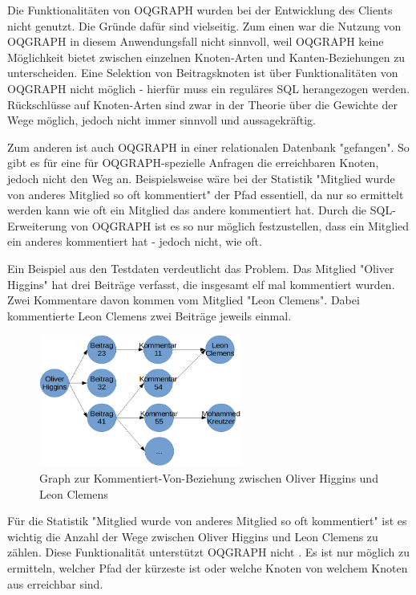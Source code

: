 Die Funktionalitäten von OQGRAPH wurden bei der Entwicklung des Clients nicht genutzt. Die Gründe dafür sind vielseitig. Zum einen war die Nutzung von OQGRAPH in diesem Anwendungsfall nicht sinnvoll, weil OQGRAPH keine Möglichkeit bietet zwischen einzelnen Knoten-Arten und Kanten-Beziehungen zu unterscheiden. Eine Selektion von Beitragsknoten ist über Funktionalitäten von OQGRAPH nicht möglich - hierfür muss ein reguläres SQL herangezogen werden. Rückschlüsse auf Knoten-Arten sind zwar in der Theorie über die Gewichte der Wege möglich, jedoch nicht immer sinnvoll und aussagekräftig.

Zum anderen ist auch OQGRAPH in einer relationalen Datenbank "gefangen". So gibt es für eine für OQGRAPH-spezielle Anfragen die erreichbaren Knoten, jedoch nicht den Weg an. Beispielsweise wäre bei der Statistik "Mitglied wurde von anderes Mitglied so oft kommentiert" der Pfad essentiell, da nur so ermittelt werden kann wie oft ein Mitglied das andere kommentiert hat. Durch die SQL-Erweiterung von OQGRAPH ist es so nur möglich festzustellen, dass ein Mitglied ein anderes kommentiert hat - jedoch nicht, wie oft.

Ein Beispiel aus den Testdaten verdeutlicht das Problem. Das Mitglied "Oliver Higgins" hat drei Beiträge verfasst, die insgesamt elf mal kommentiert wurden. Zwei Kommentare davon kommen vom Mitglied "Leon Clemens". Dabei kommentierte Leon Clemens zwei Beiträge jeweils einmal.

\begin{figure}[h]
	\caption{Graph zur Kommentiert-Von-Beziehung zwischen Oliver Higgins und Leon Clemens}
	\centering
	\includegraphics[width=0.6\textwidth]{images/graph.png}
\end{figure}

Für die Statistik "Mitglied wurde von anderes Mitglied so oft kommentiert" ist es wichtig die Anzahl der Wege zwischen Oliver Higgins und Leon Clemens zu zählen. Diese Funktionalität unterstützt OQGRAPH nicht \cite{OQGRAPH-Examples}. Es ist nur möglich zu ermitteln, welcher Pfad der kürzeste ist oder welche Knoten von welchem Knoten aus erreichbar sind.

